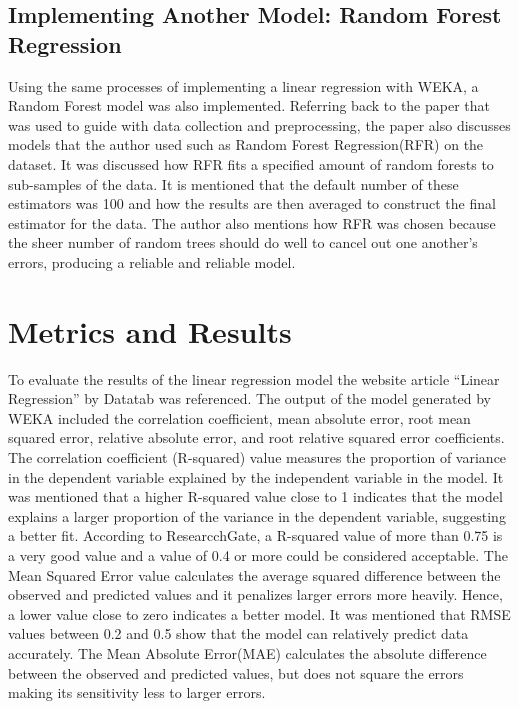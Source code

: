\documentclass[10pt,twocolumn]{article}
\begin{document}
\subsection{Implementing Another Model: Random Forest Regression}Using the same processes of implementing a linear regression with WEKA, a Random Forest model was also implemented. Referring back to the paper that was used to guide with data collection and preprocessing, the paper also discusses models that the author used such as Random Forest Regression(RFR)  on the dataset. It was discussed how RFR fits a specified amount of random forests to sub-samples of the data. It is mentioned that the default number of these estimators was 100 and how the results are then averaged to construct the final estimator for the data. The author also mentions how RFR was chosen because the sheer number of random trees should do well to cancel out one another’s errors, producing a reliable and reliable model. 



\section{Metrics and Results}
To evaluate the results of the linear regression model the website article “Linear Regression” by Datatab was referenced. The output of the model generated by WEKA included the correlation coefficient, mean absolute error, root mean squared error, relative absolute error, and root relative squared error coefficients. The correlation coefficient (R-squared) value measures the proportion of variance in the dependent variable explained by the independent variable in the model. It was mentioned that a higher R-squared value close to 1 indicates that the model explains a larger proportion of the variance in the dependent variable, suggesting a better fit. According to ResearcchGate, a R-squared value of more than 0.75 is a very good value and a value of 0.4 or more could be considered acceptable. The Mean Squared Error value calculates the average squared difference between the observed and predicted values and it penalizes larger errors more heavily. Hence, a lower value close to zero indicates a better model. It was mentioned that RMSE values between 0.2 and 0.5 show that the model can relatively predict data accurately. The Mean Absolute Error(MAE) calculates the absolute difference between the observed and predicted values, but does not square the errors making its sensitivity less to larger errors.
\end{document}
